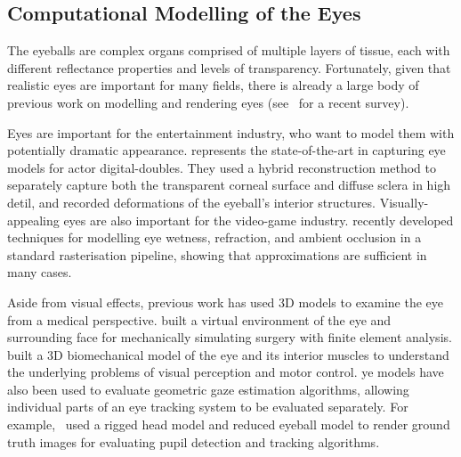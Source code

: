 
\subsection{Computational Modelling of the Eyes}



The eyeballs are complex organs comprised of multiple layers of tissue, each with different reflectance properties and levels of transparency.
Fortunately, given that realistic eyes are important for many fields, there is already a large body of previous work on modelling and rendering eyes (see~\cite{ruhland2014look} for a recent survey).


Eyes are important for the entertainment industry, who want to model them with potentially dramatic appearance. \citet{berard2014highquality} represents the state-of-the-art in capturing eye models for actor digital-doubles.
They used a hybrid reconstruction method to separately capture both the transparent corneal surface and diffuse sclera in high detil, and recorded deformations of the eyeball's interior structures. Visually-appealing eyes are also important for the video-game industry. \mbox{\citet{ActiBlizEyes}} recently developed techniques for modelling eye wetness, refraction, and ambient occlusion in a standard rasterisation pipeline, showing that approximations are sufficient in many cases.

Aside from visual effects, previous work has used 3D models to examine the eye from a medical perspective.
\citet{sagar1994virtual} built a virtual environment of the eye and surrounding face for mechanically simulating surgery with finite element analysis.
\citet{priamikov14_openeyesim} built a 3D biomechanical model of the eye and its interior muscles to understand the underlying problems of visual perception and motor control.
ye models have also been used to evaluate geometric gaze estimation algorithms, allowing individual parts of an eye tracking system to be evaluated separately.
For example,~\citet{swirski2014rendering} used a rigged head model and reduced eyeball model to render ground truth images for evaluating pupil detection and tracking algorithms.

